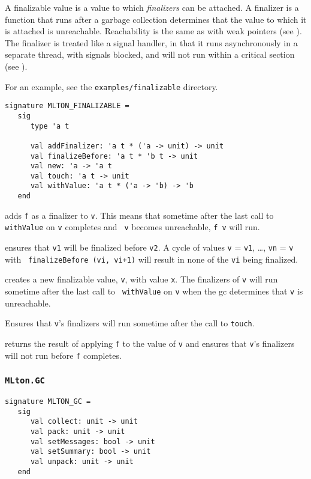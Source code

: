 A finalizable value is a value to which {\em finalizers} can be
attached.  A finalizer is a function that runs after a garbage
collection determines that the value to which it is attached is
unreachable.  Reachability is the same as with weak pointers (see
).  The finalizer is treated like a signal handler, in
that it runs asynchronously in a separate thread, with signals
blocked, and will not run within a critical section (see
).

For an example, see the {\tt examples/finalizable} directory.

\begin{verbatim}
signature MLTON_FINALIZABLE =
   sig
      type 'a t

      val addFinalizer: 'a t * ('a -> unit) -> unit
      val finalizeBefore: 'a t * 'b t -> unit
      val new: 'a -> 'a t
      val touch: 'a t -> unit
      val withValue: 'a t * ('a -> 'b) -> 'b
   end
\end{verbatim}

\begin{description}

adds {\tt f} as a finalizer to {\tt v}.  This means that sometime
after the last call to {\tt withValue} on {\tt v} completes and {\tt
v} becomes unreachable, {\tt f v} will run.

ensures that {\tt v1} will be finalized before {\tt v2}.  A cycle of
values {\tt v} = {\tt v1}, \ldots, {\tt vn} = {\tt v} with {\tt
finalizeBefore (vi, vi+1)} will result in none of the {\tt vi} being
finalized.

creates a new finalizable value, {\tt v}, with value {\tt x}.  The
finalizers of {\tt v} will run sometime after the last call to {\tt
withValue} on {\tt v} when the gc determines that {\tt v} is
unreachable.

Ensures that {\tt v}'s finalizers will run sometime after the call to
{\tt touch}.

returns the result of applying {\tt f} to the value of {\tt v} and
ensures that {\tt v}'s finalizers will not run before {\tt f}
completes.

\end{description}

\subsubsection{{\tt MLton.GC}}
%
\begin{verbatim}
signature MLTON_GC =
   sig
      val collect: unit -> unit
      val pack: unit -> unit
      val setMessages: bool -> unit
      val setSummary: bool -> unit
      val unpack: unit -> unit
   end
\end{verbatim}

